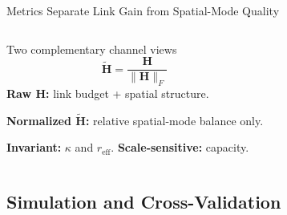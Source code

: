 \begin{frame}[t]{Metrics Separate Link Gain from Spatial-Mode Quality}
\begin{columns}[T,onlytextwidth]
  \begin{block}{Two complementary channel views}
    \begin{equation*}
      \widetilde{\mathbf H}=\frac{\mathbf H}{\lVert\mathbf H\rVert_F}
      \tag{2.22}
    \end{equation*}
    \textbf{Raw $\mathbf H$:} link budget + spatial structure.\par
    \textbf{Normalized $\widetilde{\mathbf H}$:} relative spatial-mode balance only.
    \par\smallskip
    \textbf{Invariant:} $\kappa$ and $r_{\mathrm{eff}}$.
    \textbf{Scale-sensitive:} capacity.
  \end{block}
\end{columns}
\end{frame}


\subsection{Simulation and Cross-Validation}

